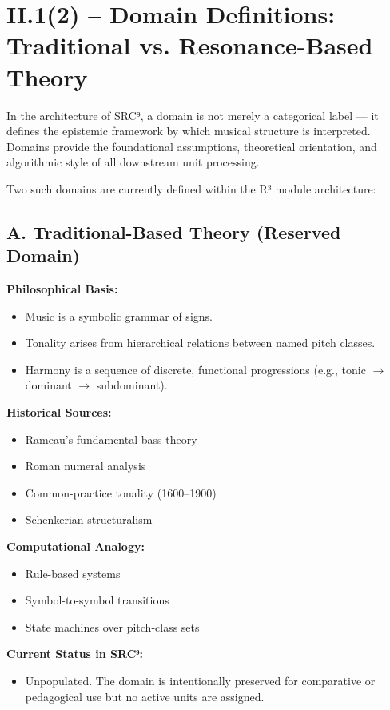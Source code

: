 \documentclass{article}
\begin{document}
\section*{II.1(2) – Domain Definitions: Traditional vs. Resonance-Based Theory}

In the architecture of SRC⁹, a domain is not merely a categorical label — it defines the epistemic framework by which musical structure is interpreted. Domains provide the foundational assumptions, theoretical orientation, and algorithmic style of all downstream unit processing.

Two such domains are currently defined within the R³ module architecture:

\subsection*{A. Traditional-Based Theory (Reserved Domain)}

\textbf{Philosophical Basis:}
\begin{itemize}
    \item Music is a symbolic grammar of signs.
    \item Tonality arises from hierarchical relations between named pitch classes.
    \item Harmony is a sequence of discrete, functional progressions (e.g., tonic $\rightarrow$ dominant $\rightarrow$ subdominant).
\end{itemize}

\textbf{Historical Sources:}
\begin{itemize}
    \item Rameau’s fundamental bass theory
    \item Roman numeral analysis
    \item Common-practice tonality (1600–1900)
    \item Schenkerian structuralism
\end{itemize}

\textbf{Computational Analogy:}
\begin{itemize}
    \item Rule-based systems
    \item Symbol-to-symbol transitions
    \item State machines over pitch-class sets
\end{itemize}

\textbf{Current Status in SRC⁹:}

\begin{itemize}
    \item Unpopulated. The domain is intentionally preserved for comparative or pedagogical use but no active units are assigned.
\end{itemize}
\end{document}
